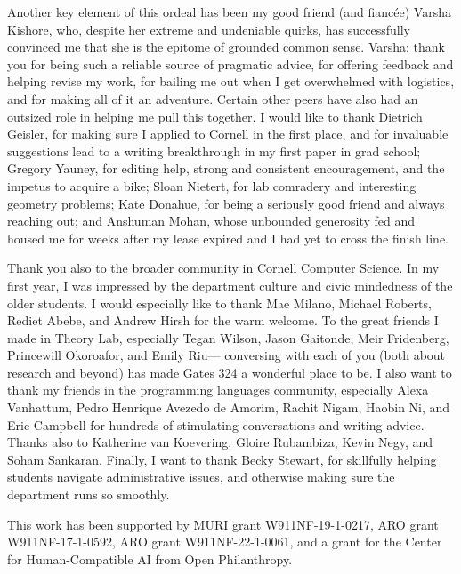 
Another key element of this ordeal has been my good friend (and fianc\'ee) Varsha Kishore,
    who, despite her extreme and undeniable quirks,
    has successfully convinced me that she is the epitome of grounded common sense. 
Varsha: thank you 
    for being such a reliable source of pragmatic advice,
    for offering feedback and helping revise my work, 
    for bailing me out when I get overwhelmed with logistics, 
    and for making all of it an adventure.
%
Certain other peers have also had an outsized role in helping me pull this together. 
I would like to thank
Dietrich Geisler, for making sure I applied to Cornell in the first place, and for invaluable suggestions lead to a writing breakthrough in my first paper in grad school;
Gregory Yauney, 
    for editing help, strong and consistent encouragement, and the impetus to acquire a bike;
Sloan Nietert, for lab comradery and interesting geometry problems;
Kate Donahue, for being a seriously good friend and always reaching out;
and Anshuman Mohan, whose unbounded generosity fed and housed me for weeks after my lease expired and I had yet to cross the finish line.  

Thank you also to the broader community in Cornell Computer Science.
In my first year, I was impressed by the department culture and civic mindedness of the older students. I would especially like to thank Mae Milano, Michael Roberts, Rediet Abebe, and Andrew Hirsh for the warm welcome. 
To the great friends I made in Theory Lab, especially 
    Tegan Wilson,
    Jason Gaitonde,
    Meir Fridenberg,
    Princewill Okoroafor,    
    and Emily Riu---%
        conversing with each of you (both about research and beyond) 
        has made Gates 324 a wonderful place to be. 
I also want to thank my friends in the programming languages community, 
    especially
    Alexa Vanhattum,
    Pedro Henrique Avezedo de Amorim,
    Rachit Nigam, 
    Haobin Ni,
    and
    Eric Campbell
    for hundreds of stimulating conversations and writing advice. 
Thanks also to Katherine van Koevering, Gloire Rubambiza, Kevin Negy, and Soham Sankaran.
Finally, I want to thank Becky Stewart, for 
    skillfully helping students navigate administrative issues,
    and otherwise making sure the department runs so smoothly.
    

This work has been supported by 
MURI grant W911NF-19-1-0217,
ARO grant W911NF-17-1-0592,
ARO grant W911NF-22-1-0061,
and
a grant for the Center for Human-Compatible AI from Open Philanthropy.
